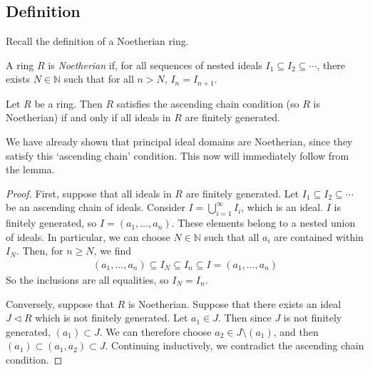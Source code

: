 \subsection{Definition}
Recall the definition of a Noetherian ring.
\begin{definition}
	A ring $R$ is \textit{Noetherian} if, for all sequences of nested ideals $I_1 \subseteq I_2 \subseteq \cdots$, there exists $N \in \mathbb N$ such that for all $n > N$, $I_n = I_{n+1}$.
\end{definition}
\begin{lemma}
	Let $R$ be a ring.
	Then $R$ satisfies the ascending chain condition (so $R$ is Noetherian) if and only if all ideals in $R$ are finitely generated.
\end{lemma}
We have already shown that principal ideal domains are Noetherian, since they satisfy this `ascending chain' condition.
This now will immediately follow from the lemma.
\begin{proof}
	First, suppose that all ideals in $R$ are finitely generated.
	Let $I_1 \subseteq I_2 \subseteq \cdots$ be an ascending chain of ideals.
	Consider $I = \bigcup_{i=1}^\infty I_i$, which is an ideal.
	$I$ is finitely generated, so $I = (a_1, \dots, a_n)$.
	These elements belong to a nested union of ideals.
	In particular, we can choose $N \in \mathbb N$ such that all $a_i$ are contained within $I_N$.
	Then, for $n \geq N$, we find
	\begin{align*}
		(a_1, \dots, a_n) \subseteq I_N \subseteq I_n \subseteq I = (a_1, \dots, a_n)
	\end{align*}
	So the inclusions are all equalities, so $I_N = I_n$.

	Conversely, suppose that $R$ is Noetherian.
	Suppose that there exists an ideal $J \triangleleft R$ which is not finitely generated.
	Let $a_1 \in J$.
	Then since $J$ is not finitely generated, $(a_1) \subset J$.
	We can therefore choose $a_2 \in J \setminus (a_1)$, and then $(a_1) \subset (a_1, a_2) \subset J$.
	Continuing inductively, we contradict the ascending chain condition.
\end{proof}

